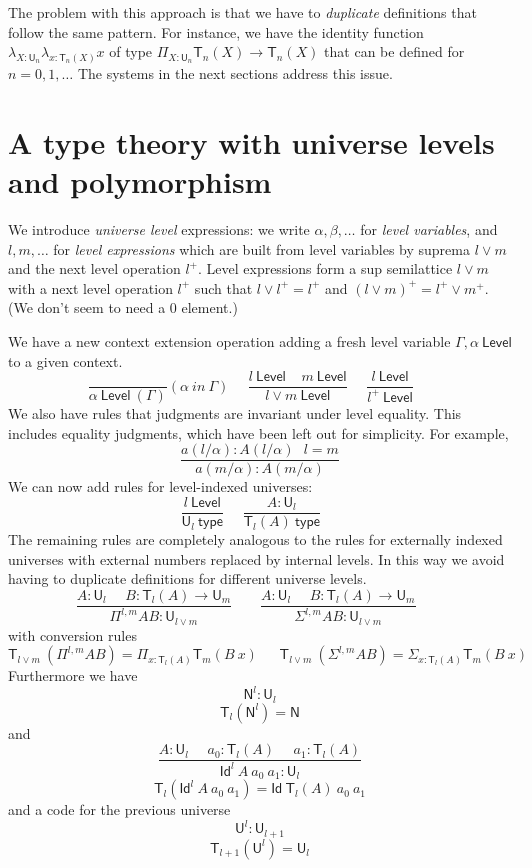 \documentclass[11pt,a4paper]{article}
\newcommand{\Id}{\mathsf{Id}}
\def\NN{\mathsf{N}}
\def\UU{\mathsf{U}}
\def\Level{\mathsf{Level}}
\newcommand{\type}{\mathsf{type}}
\newcommand{\mypi}[3]{\Pi_{#1:#2}#3}
\newcommand{\mylam}[3]{\lambda_{#1:#2}#3}
\newcommand{\mysig}[3]{\Sigma_{#1:#2}#3}
\newcommand{\T}{\mathsf{T}}
\begin{document}
The problem with this approach is that we have to {\em duplicate} definitions that follow
the same pattern. For instance, we have the identity function $\mylam{X}{\UU_n}{\mylam{x}{\T_n(X)}{x}}$
of type $\mypi{X}{\UU_n}{\T_n(X)\rightarrow \T_n(X)}$ that can be defined for $n = 0,1,\dots$
The systems in the next sections address this issue.

\section{A type theory with universe levels and polymorphism }\label{sec:internal}

We introduce {\em universe level} expressions: we write $\alpha,\beta,\dots$
for {\em level variables}, and $l,m,\dots$ for {\em level expressions} which are built from level variables
by suprema $l \vee m$ and the next level operation $l^+$.
Level expressions form a sup semilattice $l\vee m$
with a next level operation $l^+$ such that $l \vee l^+ = l^+$
and $(l\vee m)^+ = l^+\vee m^+$. (We don't seem to need a $0$ element.)

We have a new context extension operation adding a fresh level variable $\Gamma,\alpha~\Level$
to a given context.
$$
\frac{}{\alpha~\Level~(\Gamma)}(\alpha~in~\Gamma)~~~~~~
\frac{l~\Level~~~~~m~\Level}{l\vee m~\Level}~~~~~~
\frac{l~\Level}{l^+~\Level}~~~~~~
$$
We also have rules that judgments are invariant under level equality. 
This includes equality judgments, which have been left out for simplicity.
For example,
$$
\frac{a(l/\alpha) : A(l/\alpha)\ \ \ l = m}
{a(m/\alpha) : A(m/\alpha)}
$$
We can  now add rules for level-indexed universes:
$$
\frac{l~\Level}{\UU_{l}~\type}~~~~~~
\frac{A:\UU_{l}}{\T_{l}(A)~\type}~~~~~~
$$
The remaining rules are completely analogous to the rules for externally indexed universes with external numbers replaced by internal levels. In this way we avoid having to duplicate definitions for different universe levels.
$$
\frac{A:\UU_{l}~~~~~~B:\T_{l}(A)\rightarrow \UU_{m}}
     {\Pi^{l,m} A B:\UU_{l\vee m}}~~~~~~~~~
\frac{A:\UU_{l}~~~~~~B:\T_{l}(A)\rightarrow \UU_{m}}
     {\Sigma^{l,m} A B:\UU_{l\vee m}}~~~~~~~~~
$$
with conversion rules
$$
\T_{l\vee m}~(\Pi^{l,m} A B) = \mypi{x}{\T_{l}(A)}{ \T_{m}(B~x)}~~~~~~~
\T_{l\vee m}~(\Sigma^{l,m} A B) = \mysig{x}{\T_{l}(A)}{ \T_{m}(B~x)}~~~~~~~
$$
Furthermore we have $$\NN^{l}:\UU_{l}$$
$$\T_{l}(\NN^{l}) = \NN$$
and
$$
\frac{A:\UU_l~~~~~~a_0:\T_l(A)~~~~~~a_1:\T_l(A)}
{\Id^l~A~a_0~a_1:\UU_l}
$$
$$\T_l(\Id^l~A~a_0~a_1) = \Id~\T_l(A)~a_0~a_1$$
and a code for the previous universe
$${\UU^{l}}:\UU_{l + 1}$$
$$\T_{l + 1}({\UU^{l}}) = \UU_{l}$$
\end{document}
